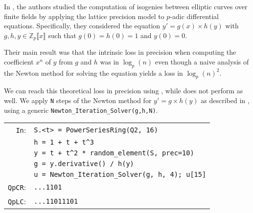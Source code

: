 \documentclass[sigconf]{acmart}
\newcommand{\ZpCR}{\text{\color{output} \rm \tt ZpCR}\xspace}
\newcommand{\ZpL}{\text{\color{output} \rm \tt ZpL}\xspace}
\newcommand{\cIn}{{\color{input} \tt \phantom{Zp}In}:}
\newcommand{\cQpCR}{{\color{output} \tt QpCR}:}
\newcommand{\cQpLC}{{\color{output} \tt QpLC}:}
\theoremstyle{definition}
\begin{document}
In \cite{LV16}, the authors studied the computation of isogenies between elliptic curves
over finite fields by applying the lattice precision model to $p$-adic
differential equations.  Specifically, they considered the equation
$y'=g(x) \times h(y)$ with
$g,h,y \in \mathbb{Z}_p \llbracket x \rrbracket$
such that $g(0)=h(0)=1$ and $y(0)=0.$

Their main result was that the intrinsic loss in precision
when computing the coefficient $x^n$ of $y$
from $g$ and $h$ was in $\log_p(n)$
even though a naive analysis of
the Newton method for solving the equation
yields a loss in $\log_p(n)^2.$

We can reach this theoretical loss in precision using \ZpL, while \ZpCR does not perform as well.
We apply \verb?N? steps of the Newton method for 
$y'=g \times h(y)$ as described in \cite{LV16}, using a generic {\color{function}\verb?Newton_Iteration_Solver?}\verb?(g,h,N)?.

\smallskip

{\noindent \small
\begin{tabular}{rl}
\cIn
 & \verb?S.<t> = ?{\color{constructor}\verb?PowerSeriesRing?}\verb?(?{\color{ring}\verb?Q2?}\verb?, 16)? \\
 & \verb?h = 1 + t + t^3? \\
 & \verb?y = t + t^2 * ?{\color{function}\verb?random_element?}\verb?(S, prec=10)? \\
 & \verb?g = y.derivative() / h(y)? \\
 & \verb?u = ?{\color{function}\verb?Newton_Iteration_Solver?}\verb?(g, h, 4); u[15]? \\
\cQpCR
 & \verb?...1101? \\
\cQpLC
 & \verb?...11011101? \\
\end{tabular}}
\end{document}
